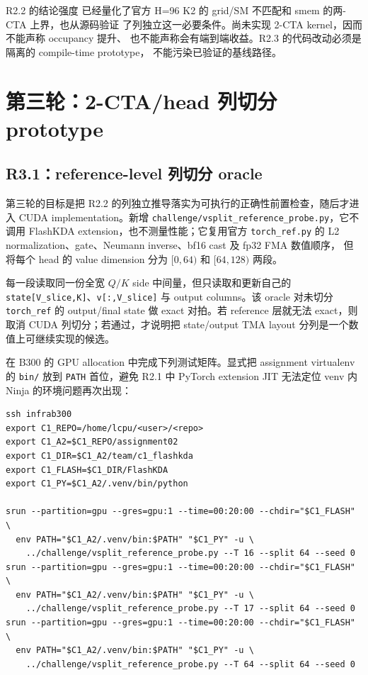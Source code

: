 \documentclass[11pt,a4paper,fontset=none]{ctexart}
\newcommand{\code}[1]{\texttt{#1}}
\begin{document}
\begin{record}{R2.2 的结论强度}
已经量化了官方 H=96 K2 的 grid/SM 不匹配和 smem 的两-CTA 上界，也从源码验证
了列独立这一必要条件。尚未实现 2-CTA kernel，因而不能声称 occupancy 提升、
也不能声称会有端到端收益。R2.3 的代码改动必须是隔离的 compile-time prototype，
不能污染已验证的基线路径。
\end{record}

\clearpage
\section{第三轮：2-CTA/head 列切分 prototype}

\subsection{R3.1：reference-level 列切分 oracle}

第三轮的目标是把 R2.2 的列独立推导落实为可执行的正确性前置检查，随后才进入
CUDA implementation。新增 \code{challenge/vsplit\_reference\_probe.py}，它不
调用 FlashKDA extension，也不测量性能；它复用官方 \code{torch\_ref.py} 的
L2 normalization、gate、Neumann inverse、bf16 cast 及 fp32 FMA 数值顺序，
但将每个 head 的 value dimension 分为 \([0,64)\) 和 \([64,128)\) 两段。

每一段读取同一份全宽 \(Q/K\) side 中间量，但只读取和更新自己的
\code{state[V\_slice,K]}、\code{v[:,V\_slice]} 与 output columns。该 oracle
对未切分 \code{torch\_ref} 的 output/final state 做 exact 对拍。若 reference
层就无法 exact，则取消 CUDA 列切分；若通过，才说明把 state/output TMA layout
分列是一个数值上可继续实现的候选。

在 B300 的 GPU allocation 中完成下列测试矩阵。显式把 assignment virtualenv
的 \code{bin/} 放到 \code{PATH} 首位，避免 R2.1 中 PyTorch extension JIT
无法定位 venv 内 Ninja 的环境问题再次出现：

\begin{lstlisting}
ssh infrab300
export C1_REPO=/home/lcpu/<user>/<repo>
export C1_A2=$C1_REPO/assignment02
export C1_DIR=$C1_A2/team/c1_flashkda
export C1_FLASH=$C1_DIR/FlashKDA
export C1_PY=$C1_A2/.venv/bin/python

srun --partition=gpu --gres=gpu:1 --time=00:20:00 --chdir="$C1_FLASH" \
  env PATH="$C1_A2/.venv/bin:$PATH" "$C1_PY" -u \
    ../challenge/vsplit_reference_probe.py --T 16 --split 64 --seed 0
srun --partition=gpu --gres=gpu:1 --time=00:20:00 --chdir="$C1_FLASH" \
  env PATH="$C1_A2/.venv/bin:$PATH" "$C1_PY" -u \
    ../challenge/vsplit_reference_probe.py --T 17 --split 64 --seed 0
srun --partition=gpu --gres=gpu:1 --time=00:20:00 --chdir="$C1_FLASH" \
  env PATH="$C1_A2/.venv/bin:$PATH" "$C1_PY" -u \
    ../challenge/vsplit_reference_probe.py --T 64 --split 64 --seed 0
\end{lstlisting}
\end{document}
